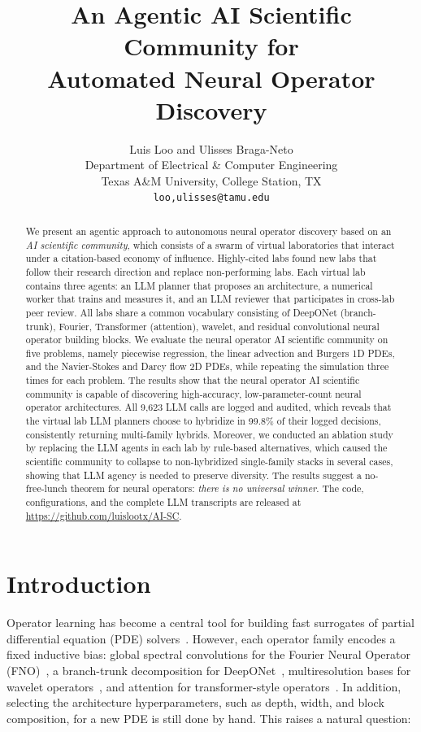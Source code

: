 \documentclass{article}
\title{An Agentic AI Scientific Community for\\ Automated Neural Operator Discovery}
\author{%
  Luis Loo and Ulisses Braga-Neto \\[1ex]
  Department of Electrical \& Computer Engineering\\
  Texas A\&M University, College Station, TX\\
  \texttt{loo,ulisses@tamu.edu}
}
\begin{document}
\maketitle

\begin{abstract}
We present an agentic approach to autonomous neural operator discovery based on an \emph{AI scientific community}, which  consists of a swarm of virtual laboratories that interact under a citation-based economy of influence. Highly-cited labs found new labs that follow their research direction and replace non-performing labs. Each virtual lab contains three agents: an LLM planner that proposes an architecture, a numerical worker that trains and measures it, and an LLM reviewer that participates in cross-lab peer review. All labs share a common vocabulary consisting of DeepONet (branch-trunk), Fourier, Transformer (attention), wavelet, and residual convolutional neural operator building blocks. We evaluate the neural operator AI scientific community on five problems, namely piecewise regression, the linear advection and Burgers 1D PDEs, and the Navier-Stokes and Darcy flow 2D PDEs, while repeating the simulation three times for each problem. The results show that the neural operator AI scientific community is capable of discovering high-accuracy, low-parameter-count neural operator architectures. All 9{,}623 LLM calls are logged and audited, which reveals that the virtual lab LLM planners choose to hybridize in 99.8\% of their logged decisions, consistently returning multi-family hybrids. Moreover, we conducted an ablation study by replacing the LLM agents in each lab by rule-based alternatives, which caused
the scientific community to collapse to non-hybridized single-family stacks in several cases, showing that LLM agency is needed to preserve diversity. The results suggest a no-free-lunch theorem for neural operators: \emph{there is no universal winner}. The code, configurations, and the complete LLM transcripts are released at \url{https://github.com/luislootx/AI-SC}.
\end{abstract}

\section{Introduction}
Operator learning has become a central tool for building fast surrogates of partial differential equation (PDE) solvers~\cite{li2021fno,lu2021deeponet,kovachki2023neuraloperator}. However, each operator family encodes a fixed inductive bias: global spectral convolutions for the Fourier Neural Operator (FNO)~\cite{li2021fno}, a branch-trunk decomposition for DeepONet~\cite{lu2021deeponet}, multiresolution bases for wavelet operators~\cite{tripura2023wno}, and attention for transformer-style operators~\cite{cao2021galerkin,hao2023gnot}. In addition, selecting the architecture hyperparameters, such as depth, width, and block composition, for a new PDE is still done by hand.
This raises a natural question:
\end{document}
